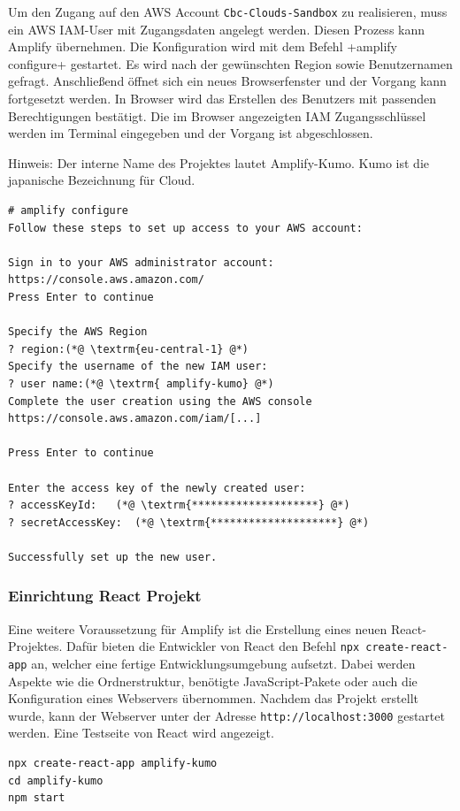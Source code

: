 Um den Zugang auf den AWS Account \verb+Cbc-Clouds-Sandbox+ zu realisieren, muss ein AWS IAM-User mit Zugangsdaten angelegt werden.
Diesen Prozess kann Amplify übernehmen.
Die Konfiguration wird mit dem Befehl \spverb+amplify configure+ gestartet.
Es wird nach der gewünschten Region sowie Benutzernamen gefragt.
Anschließend öffnet sich ein neues Browserfenster und der Vorgang kann fortgesetzt werden.
In Browser wird das Erstellen des Benutzers mit passenden Berechtigungen bestätigt.
Die im Browser angezeigten IAM Zugangsschlüssel werden im Terminal eingegeben und der Vorgang ist abgeschlossen.\cite{ImpVoraus}

Hinweis: Der interne Name des Projektes lautet Amplify-Kumo.
Kumo ist die japanische Bezeichnung für \glqq Cloud\grqq.
\\

\begin{lstlisting}[basicstyle=\ttfamily\small, breaklines=true , frame = single, backgroundcolor=\color{flashwhite} ]
# amplify configure
Follow these steps to set up access to your AWS account:

Sign in to your AWS administrator account:
https://console.aws.amazon.com/
Press Enter to continue

Specify the AWS Region
? region:(*@ \textrm{eu-central-1} @*)
Specify the username of the new IAM user:
? user name:(*@ \textrm{ amplify-kumo} @*)
Complete the user creation using the AWS console
https://console.aws.amazon.com/iam/[...]

Press Enter to continue

Enter the access key of the newly created user:
? accessKeyId:   (*@ \textrm{********************} @*)
? secretAccessKey:  (*@ \textrm{********************} @*)

Successfully set up the new user.
\end{lstlisting}

\clearpage
\subsubsection{Einrichtung React Projekt}

Eine weitere Voraussetzung für Amplify ist die Erstellung eines neuen React-Projektes.
Dafür bieten die Entwickler von React den Befehl \verb+npx create-react-app+ an, welcher eine fertige Entwicklungsumgebung aufsetzt.
Dabei werden Aspekte wie die Ordnerstruktur, benötigte JavaScript-Pakete oder auch die Konfiguration eines Webservers übernommen.\cite{ReactNew}
Nachdem das Projekt erstellt wurde, kann der Webserver unter der Adresse \verb+http://localhost:3000+ gestartet werden.
Eine Testseite von React wird angezeigt.
\\
\begin{lstlisting}[basicstyle=\ttfamily\small, breaklines=true , frame = single, backgroundcolor=\color{flashwhite} ]
npx create-react-app amplify-kumo
cd amplify-kumo
npm start
\end{lstlisting}


